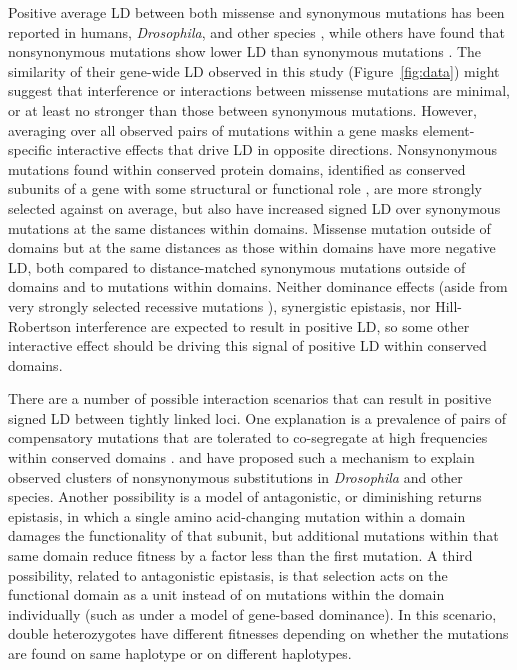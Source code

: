 \documentclass[]{article}
\begin{document}
Positive average LD between both missense and synonymous mutations has been
reported in humans, \emph{Drosophila}, and other species
\citep{Sohail2017-zq,Sandler2021-of}, while others have found that
nonsynonymous mutations show lower LD than synonymous mutations
\citep{Garcia2021-zn}. The similarity of their gene-wide LD observed in this
study (Figure~\ref{fig:data}) might suggest that interference or interactions
between missense mutations are minimal, or at least no stronger than those
between synonymous mutations. However, averaging over all observed pairs of
mutations within a gene masks element-specific interactive effects that drive
LD in opposite directions. Nonsynonymous mutations found within conserved
protein domains, identified as conserved subunits of a gene with some
structural or functional role \citep{Stanek2020-pa}, are more strongly selected
against on average, but also have increased signed LD over synonymous mutations
at the same distances within domains. Missense mutation outside of domains but
at the same distances as those within domains have more negative LD, both
compared to distance-matched synonymous mutations outside of domains and to
mutations within domains.  Neither dominance effects (aside from very strongly
selected recessive mutations \citep{Roze2021-cf}), synergistic epistasis, nor
Hill-Robertson interference are expected to result in positive LD, so some
other interactive effect should be driving this signal of positive LD within
conserved domains.

There are a number of possible interaction scenarios that can result in
positive signed LD between tightly linked loci. One explanation is a prevalence
of pairs of compensatory mutations that are tolerated to co-segregate at high
frequencies within conserved domains \citep{Yeang2007-gj,Ivankov2014-tn}.
\citet{Callahan2011-ac} and \citet{Taverner2020-lk} have proposed such a
mechanism to explain observed clusters of nonsynonymous substitutions in
\emph{Drosophila} and other species. Another possibility is a model of
antagonistic, or diminishing returns epistasis, in which a single amino
acid-changing mutation within a domain damages the functionality of that
subunit, but additional mutations within that same domain reduce fitness by a
factor less than the first mutation. A third possibility, related to
antagonistic epistasis, is that selection acts on the functional domain as a
unit instead of on mutations within the domain individually (such as under a
model of gene-based dominance). In this scenario, double heterozygotes have
different fitnesses depending on whether the mutations are found on same
haplotype or on different haplotypes.
\end{document}
